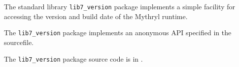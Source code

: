 
The standard library {\tt lib7\_version} package implements a simple facility 
for accessing the version and build date of the Mythryl runtime.

The {\tt lib7\_version} package implements an anonymous API specified in the sourcefile.

The {\tt lib7\_version} package source code is in .




